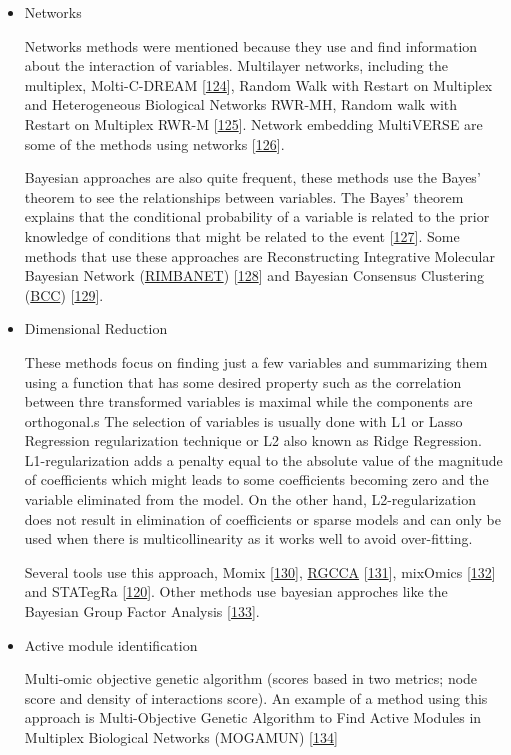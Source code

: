 \documentclass[
  12pt,
  a4paper,
  twoside,
  openright]{book}
\begin{document}
\begin{itemize}
\item
  Networks

  Networks methods were mentioned because they use and find information about the interaction of variables.
  Multilayer networks, including the multiplex, Molti-C-DREAM {[}\protect\hyperlink{ref-didier2018}{124}{]}, Random Walk with Restart on Multiplex and Heterogeneous Biological Networks RWR-MH, Random walk with Restart on Multiplex RWR-M {[}\protect\hyperlink{ref-valdeolivas2019}{125}{]}.
  Network embedding MultiVERSE are some of the methods using networks {[}\protect\hyperlink{ref-pio-lopez2021}{126}{]}.

  Bayesian approaches are also quite frequent, these methods use the Bayes' theorem to see the relationships between variables.
  The Bayes' theorem explains that the conditional probability of a variable is related to the prior knowledge of conditions that might be related to the event {[}\protect\hyperlink{ref-bayes1763}{127}{]}.
  Some methods that use these approaches are Reconstructing Integrative Molecular Bayesian Network (\href{https://labs.icahn.mssm.edu/zhulab/?s=rimbanet}{RIMBANET}) {[}\protect\hyperlink{ref-zhu2012}{128}{]} and Bayesian Consensus Clustering (\href{https://github.com/ttriche/bayesCC}{BCC}) {[}\protect\hyperlink{ref-lock2013}{129}{]}.
\item
  Dimensional Reduction

  These methods focus on finding just a few variables and summarizing them using a function that has some desired property such as the correlation between thre transformed variables is maximal while the components are orthogonal.s The selection of variables is usually done with L1 or Lasso Regression regularization technique or L2 also known as Ridge Regression.
  L1-regularization adds a penalty equal to the absolute value of the magnitude of coefficients which might leads to some coefficients becoming zero and the variable eliminated from the model.
  On the other hand, L2-regularization does not result in elimination of coefficients or sparse models and can only be used when there is multicollinearity as it works well to avoid over-fitting.

  Several tools use this approach, Momix {[}\protect\hyperlink{ref-cantini2021}{130}{]}, \protect\hyperlink{acronyms_RGCCA}{RGCCA} {[}\protect\hyperlink{ref-tenenhaus2017}{131}{]}, mixOmics {[}\protect\hyperlink{ref-rohart2017}{132}{]} and STATegRa {[}\protect\hyperlink{ref-gomez-cabrero2019}{120}{]}.
  Other methods use bayesian approches like the Bayesian Group Factor Analysis {[}\protect\hyperlink{ref-virtanen2012}{133}{]}.
\item
  Active module identification

  Multi-omic objective genetic algorithm (scores based in two metrics; node score and density of interactions score).
  An example of a method using this approach is Multi-Objective Genetic Algorithm to Find Active Modules in Multiplex Biological Networks (MOGAMUN) {[}\protect\hyperlink{ref-novoa-del-toro2020}{134}{]}
\end{itemize}
\end{document}
